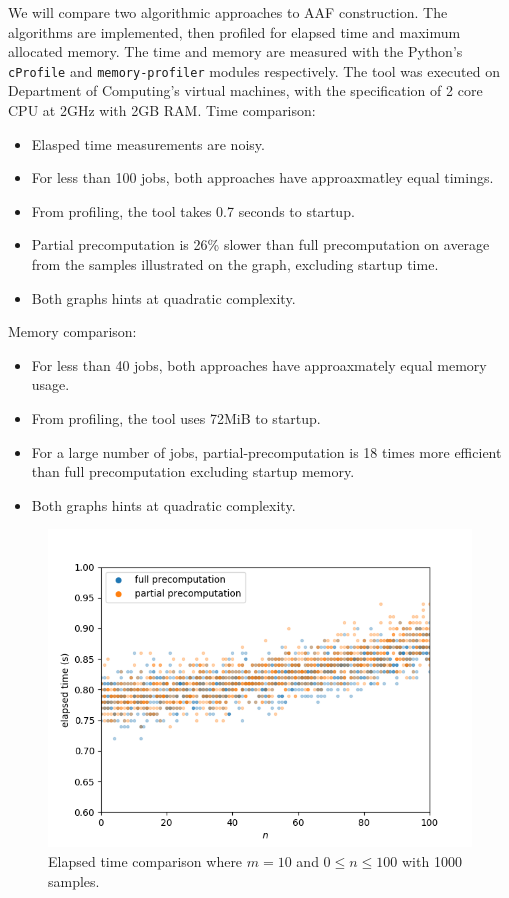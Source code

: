 We will compare two algorithmic approaches to AAF construction. The algorithms are implemented, then profiled for elapsed time and maximum allocated memory. The time and memory are measured with the Python's \texttt{cProfile} and \texttt{memory-profiler} modules respectively. The tool was executed on Department of Computing's virtual machines, with the specification of 2 core CPU at 2GHz with 2GB RAM.
\linespace
Time comparison:
\begin{itemize}
	\item Elasped time measurements are noisy.
	\item For less than 100 jobs, both approaches have approaxmatley equal timings.
	\item From profiling, the tool takes 0.7 seconds to startup.
	\item Partial precomputation is 26\% slower than full precomputation on average from the samples illustrated on the graph, excluding startup time.
	\item Both graphs hints at quadratic complexity.
\end{itemize}

Memory comparison:
\begin{itemize}
	\item For less than 40 jobs, both approaches have approaxmately equal memory usage.
	\item From profiling, the tool uses 72MiB to startup.
	\item For a large number of jobs, partial-precomputation is 18 times more efficient than full precomputation excluding startup memory.
	\item Both graphs hints at quadratic complexity.
\end{itemize}

\newpage

\begin{figure}[H]
	\centering
	\includegraphics[scale=0.7]{figures/precomputation_cpu_small}
	\caption{Elapsed time comparison where $m=10$ and $0\leq n\leq 100$ with 1000 samples.}
\end{figure}

